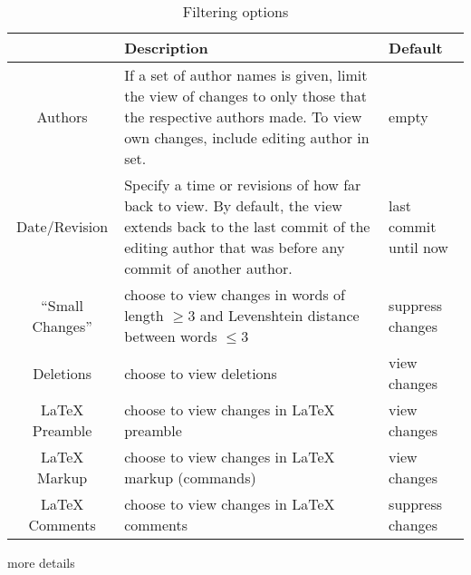 \begin{table}
\centering
\begin{tabular}{cp{3.5in}p{1.1in}} \toprule
& Description & Default \\\midrule
Authors & If a set of author names is given, limit the view of changes to only those that the respective authors made. To view own changes, include editing author in set. & empty \\
Date/Revision & Specify a time or revisions of how far back to view.  By default, the view extends back to the last commit of the editing author that was before any commit of another author. & last commit until now\\
``Small Changes'' & choose to view changes in words of length $\geq 3$ and Levenshtein distance between words $\leq 3$ & suppress changes \\
Deletions & choose to view deletions & view changes \\
LaTeX Preamble & choose to view changes in LaTeX preamble & view changes \\
LaTeX Markup & choose to view changes in LaTeX markup (commands) & view changes \\
LaTeX Comments & choose to view changes in LaTeX comments & suppress changes \\
\bottomrule
\end{tabular}
\caption{Filtering options} \label{tab:filter}
\end{table}

more details